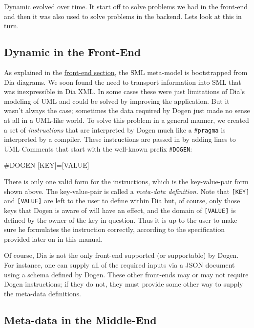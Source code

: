\documentclass{book}
\begin{document}
Dynamic evolved over time. It start off to solve problems we had in
the front-end and then it was also used to solve problems in the
backend. Lets look at this in turn.

\subsection{Dynamic in the Front-End}

As explained in the
\href{https://github.com/DomainDrivenConsulting/dogen/blob/master/doc/manual/manual.org#the-front-end}{front-end
  section}, the SML meta-model is bootstrapped from Dia diagrams. We
soon found the need to transport information into SML that was
inexpressible in Dia XML. In some cases these were just limitations of
Dia's modeling of UML and could be solved by improving the
application. But it wasn't always the case; sometimes the data
required by Dogen just made no sense at all in a UML-like world. To
solve this problem in a general manner, we created a set of
\emph{instructions} that are interpreted by Dogen much like a
\texttt{\#pragma} is interpreted by a compiler. These instructions are
passed in by adding lines to UML Comments that start with the
well-known prefix \texttt{\#DOGEN}:

\begin{pseudocode}[backgroundcolor=\color{lightgray}]
#DOGEN [KEY]=[VALUE]
\end{pseudocode}

There is only one valid form for the instructions, which is the
key-value-pair form shown above. The key-value-pair is called a
\emph{meta-data definition}. Note that \texttt{[KEY]} and
\texttt{[VALUE]} are left to the user to define within Dia but, of
course, only those keys that Dogen is aware of will have an effect,
and the domain of \texttt{[VALUE]} is defined by the owner of the key
in question. Thus it is up to the user to make sure he formulates the
instruction correctly, according to the specification provided later
on in this manual.

Of course, Dia is not the only front-end supported (or supportable) by
Dogen. For instance, one can supply all of the required inputs via a
JSON document using a schema defined by Dogen. These other front-ends
may or may not require Dogen instructions; if they do not, they must
provide some other way to supply the meta-data definitions.

\subsection{Meta-data in the Middle-End}
\end{document}
